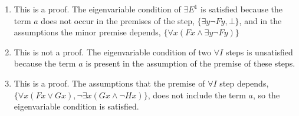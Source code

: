 \begin{enumerate}[label=\alph*)]
\item
This is a proof. The eigenvariable condition of $\exists E^1$ is satisfied because the term $a$ does not occur in the premises of the step, $\{ \exists y \neg Fy, \bot \}$, and in the assumptions the minor premise depends, $\{ \forall x (Fx \land \exists y \neg Fy) \}$

\item 
This is not a proof. The eigenvariable condition of two $\forall I$ steps is unsatisfied because the term $a$ is present in the assumption of the premise of these steps.

\item
This is a proof. The assumptions that the premise of $\forall I$ step depends, $\{ \forall x (Fx \lor Gx), \neg\exists x (Gx \land \neg Hx) \}$, does not include the term $a$, so the eigenvariable condition is satisfied.

\end{enumerate}